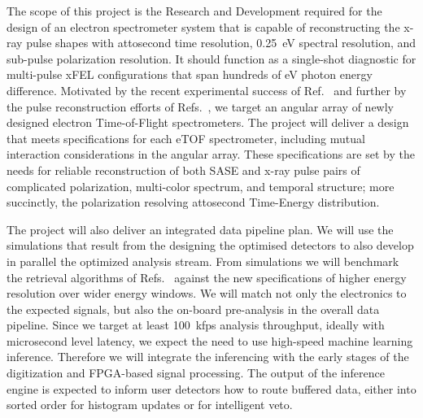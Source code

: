 The scope of this project is the Research and Development required for the design of an electron spectrometer system that is capable of reconstructing the x-ray pulse shapes with attosecond time resolution, 0.25~eV spectral resolution, and sub-pulse polarization resolution.
It should function as a single-shot diagnostic for multi-pulse xFEL configurations that span hundreds of eV photon energy difference.
Motivated by the recent experimental success of Ref.~\cite{Nick2018} and further by the pulse reconstruction efforts of Refs.~\cite{Siqi2018,Feurer2018}, we target an angular array of newly designed electron Time-of-Flight spectrometers.  
The project will deliver a design that meets specifications for each eTOF spectrometer, including mutual interaction considerations in the angular array.
These specifications are set by the needs for reliable reconstruction of both SASE and x-ray pulse pairs of complicated polarization, multi-color spectrum, and temporal structure; more succinctly, the polarization resolving attosecond Time-Energy distribution.

The project will also deliver an integrated data pipeline plan.
We will use the simulations that result from the designing the optimised detectors to also develop in parallel the optimized analysis stream.  
From simulations we will benchmark the retrieval algorithms of Refs.~\cite{Nick2018,Siqi2018,Feurer2018} against the new specifications of higher energy resolution over wider energy windows.
We will match not only the electronics to the expected signals, but also the on-board pre-analysis in the overall data pipeline.
Since we target at least 100~kfps analysis throughput, ideally with microsecond level latency, we expect the need to use high-speed machine learning inference.
Therefore we will integrate the inferencing with the early stages of the digitization and FPGA-based signal processing.
The output of the inference engine is expected to inform user detectors how to route buffered data, either into sorted order for histogram updates or for intelligent veto.


